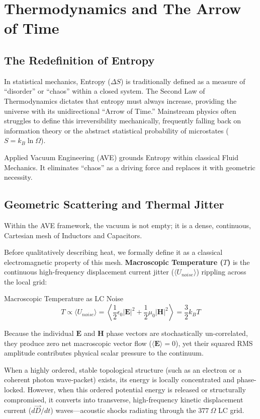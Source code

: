 \chapter{Thermodynamics and The Arrow of Time}
\label{ch:thermodynamics}

\section{The Redefinition of Entropy}
In statistical mechanics, Entropy ($\Delta S$) is traditionally defined as a measure of ``disorder'' or ``chaos'' within a closed system. The Second Law of Thermodynamics dictates that entropy must always increase, providing the universe with its unidirectional ``Arrow of Time.'' Mainstream physics often struggles to define this irreversibility mechanically, frequently falling back on information theory or the abstract statistical probability of microstates ($S = k_B \ln \Omega$).

Applied Vacuum Engineering (AVE) grounds Entropy within classical Fluid Mechanics. It eliminates ``chaos'' as a driving force and replaces it with geometric necessity.

\section{Geometric Scattering and Thermal Jitter}
Within the AVE framework, the vacuum is not empty; it is a dense, continuous, Cartesian mesh of Inductors and Capacitors. 

Before qualitatively describing heat, we formally define it as a classical electromagnetic property of this mesh. \textbf{Macroscopic Temperature ($T$)} is the continuous high-frequency displacement current jitter ($\langle U_{noise} \rangle$) rippling across the local grid:
\begin{resultbox}{Macroscopic Temperature as LC Noise}
\begin{equation}
    T \propto \langle U_{noise} \rangle = \left\langle \frac{1}{2}\epsilon_0 |\mathbf{E}|^2 + \frac{1}{2}\mu_0 |\mathbf{H}|^2 \right\rangle = \frac{3}{2} k_B T
\end{equation}
\end{resultbox}
Because the individual $\mathbf{E}$ and $\mathbf{H}$ phase vectors are stochastically un-correlated, they produce zero net macroscopic vector flow ($\langle \mathbf{E} \rangle = 0$), yet their squared RMS amplitude contributes physical scalar pressure to the continuum. 

When a highly ordered, stable topological structure (such as an electron or a coherent photon wave-packet) exists, its energy is locally concentrated and phase-locked. However, when this ordered potential energy is released or structurally compromised, it converts into transverse, high-frequency kinetic displacement current ($d\vec{D}/dt$) waves---acoustic shocks radiating through the $377 \ \Omega$ LC grid.

